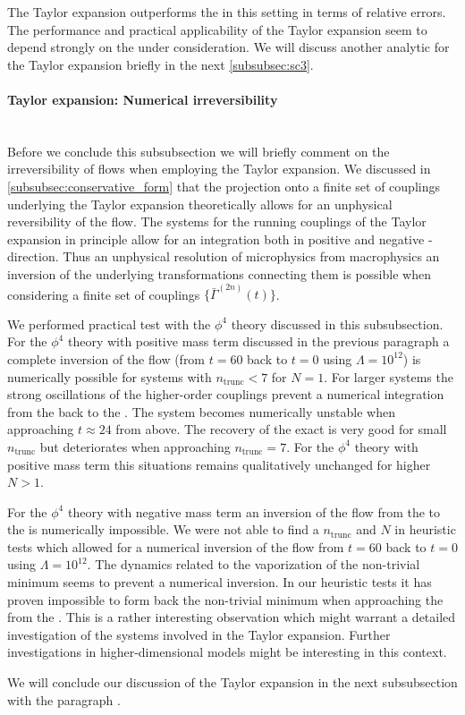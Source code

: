 The Taylor expansion outperforms the \ktScheme{} in this setting in terms of relative errors.
The performance and practical applicability of the Taylor expansion seem to depend strongly on the \ic{} under consideration.
We will discuss another analytic \ic{} for the Taylor expansion briefly in the next \cref{subsubsec:sc3}.

\paragraph{\frg{} Taylor expansion: Numerical irreversibility}\label{paragraph:sc2taylorIRR}\mbox{}\\
Before we conclude this subsubsection we will briefly comment on the irreversibility of \grg{} flows when employing the \frg{} Taylor expansion.
We discussed in \cref{subsubsec:conservative_form} that the projection onto a finite set of couplings underlying the \frg{} Taylor expansion theoretically allows for an unphysical reversibility of the \grg{} flow.
The \ode{} systems for the running couplings of the \frg{} Taylor expansion in principle allow for an integration both in positive and negative \rgtime{}-direction.
Thus an unphysical resolution of microphysics from macrophysics \dash{} an inversion of the underlying \rg{} transformations connecting them \dash{} is possible when considering a finite set of couplings $\{\bar{\Gamma}^{(2n)}(t)\}$.

We performed practical test with the $\phi^4$ theory discussed in this subsubsection.
For the $\phi^4$ theory with positive mass term discussed in the previous paragraph a complete inversion of the \frg{} flow (from $t=60$ back to $t=0$ using $\Lambda=10^{12}$) is numerically possible for systems with $n_\mathrm{trunc}<7$ for $N=1$.
For larger systems the strong oscillations of the higher-order couplings prevent a numerical integration from the \ir{} back to the \uv{}.
The \ode{} system becomes numerically unstable when approaching $t\approx 24$ from above.
The recovery of the exact \uv{} \ic{} is very good for small $n_\mathrm{trunc}$ but deteriorates when approaching $n_\mathrm{trunc}=7$.
For the $\phi^4$ theory with positive mass term this situations remains qualitatively unchanged for higher $N>1$.

For the $\phi^4$ theory with negative mass term an inversion of the \frg{} flow from the \ir{} to the \uv{} is numerically impossible.
We were not able to find a $n_\mathrm{trunc}$ and $N$ in heuristic tests which allowed for a numerical inversion of the \frg{} flow from $t=60$ back to $t=0$ using $\Lambda=10^{12}$.
The dynamics related to the vaporization of the non-trivial minimum seems to prevent a numerical inversion.
In our heuristic tests it has proven impossible to form back the non-trivial minimum when approaching the \uv{} from the \ir{}.
This is a rather interesting observation which might warrant a detailed investigation of the \ode{} systems involved in the \frg{} Taylor expansion.
Further investigations in higher-dimensional models might be interesting in this context.\bigskip

We will conclude our discussion of the \frg{} Taylor expansion in the next subsubsection with the paragraph .